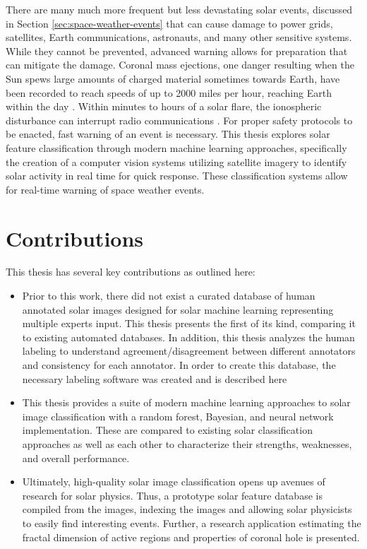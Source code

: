 \documentclass[twoside]{report}
\begin{document}
There are many much more frequent but less devastating solar events, discussed in Section \ref{sec:space-weather-events} that can cause damage to power grids, satellites, Earth communications, astronauts, and many other sensitive systems. While they cannot be prevented, advanced warning allows for preparation that can mitigate the damage. Coronal mass ejections, one danger resulting when the Sun spews large amounts of charged material sometimes towards Earth, have been recorded to reach speeds of up to 2000 miles per hour, reaching Earth within the day \cite{fastcme}. Within minutes to hours of a solar flare, the ionospheric disturbance can interrupt radio communications \cite{swap}. For proper safety protocols to be enacted, fast warning of an event is necessary.  This thesis explores solar feature classification through modern machine learning approaches, specifically the creation of a computer vision systems utilizing satellite imagery to identify solar activity in real time for quick response. These classification systems allow for real-time warning of space weather events.

\section{Contributions}

This thesis has several key contributions as outlined here:
\begin{itemize}
\item Prior to this work, there did not exist a curated database of human annotated solar images designed for solar machine learning representing multiple experts input. This thesis presents the first of its kind, comparing it to existing automated databases. In addition, this thesis analyzes the human labeling to understand agreement/disagreement between different annotators and consistency for each annotator. In order to create this database, the necessary labeling software was created and is described here
\item This thesis provides a suite of modern machine learning approaches to solar image classification with a random forest, Bayesian, and neural network implementation. These are compared to existing solar classification approaches as well as each other to characterize their strengths, weaknesses, and overall performance.
\item Ultimately, high-quality solar image classification opens up avenues of research for solar physics. Thus, a prototype solar feature database is compiled from the images, indexing the images and allowing solar physicists to easily find interesting events. Further, a research application estimating the fractal dimension of active regions and properties of coronal hole is presented.
\end{itemize}
\end{document}
